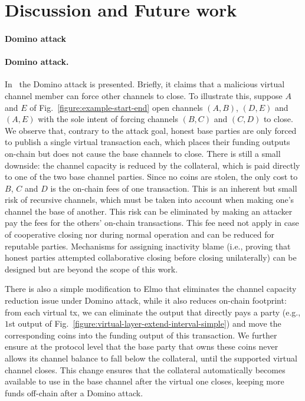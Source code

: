 \section{Discussion and Future work}
\label{sec:future-work}
\makeatletter%
%
  {\paragraph{Domino attack}}%
  {\paragraph{Domino attack.}}%
\makeatother%
In~\cite{donner} the Domino attack is presented. Briefly, it claims that a
malicious virtual channel member can force other channels to close. To
illustrate this, suppose $A$ and $E$ of Fig.~\ref{figure:example-start-end} open
channels
$(A, B)$, $(D, E)$ and $(A, E)$ with the sole intent of forcing channels $(B,
C)$ and $(C, D)$ to close. We observe that, contrary to the attack goal, honest
base parties are only
forced to publish a single virtual transaction each, which places their funding
outputs on-chain but does not cause the base channels to close. There is still a
small downside:
the channel capacity is reduced by the collateral, which
is paid directly to one of the two base channel parties. Since no coins are
stolen, the only cost to $B$, $C$ and $D$ is the on-chain fees
of one transaction. This is an inherent but small risk of
recursive channels, which must be taken into account when making one's
channel the base of another. This risk can be eliminated by making an attacker
pay the fees for the others' on-chain transactions. This fee need not apply in
case of cooperative closing nor
during normal operation and can be reduced for reputable parties.
Mechanisms for assigning inactivity blame (i.e., proving that honest parties
attempted collaborative closing before closing unilaterally) can be designed but
are beyond the scope of this work.

There is also a simple modification to Elmo that eliminates the channel capacity reduction issue under Domino attack, while it also reduces on-chain
footprint: from each virtual tx, we can
eliminate the output that directly
pays a party (e.g., $1$st output of
Fig.~\ref{figure:virtual-layer-extend-interval-simple}) and move the
corresponding coins into the funding output of this transaction. We further
ensure at the protocol level that the base party that owns these coins never
allows its channel balance to fall below the collateral, until the supported
virtual channel closes. This change ensures that the collateral
automatically becomes available to use in the base channel after the virtual one
closes, keeping more funds off-chain after a Domino attack.


